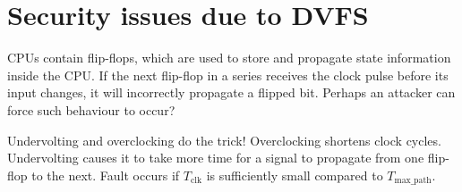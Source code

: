 \section{Security issues due to DVFS}

CPUs contain flip-flops, which are used to store and propagate state information
inside the CPU.
If the next flip-flop in a series receives the clock pulse before its input
changes, it will incorrectly propagate a flipped bit.
Perhaps an attacker can force such behaviour to occur?

Undervolting and overclocking do the trick!
Overclocking shortens clock cycles.
Undervolting causes it to take more time for a signal to propagate from one
flip-flop to the next.
Fault occurs if $T_{\mathrm{clk}}$ is sufficiently small compared to
$T_{\mathrm{max\_path}}$.



